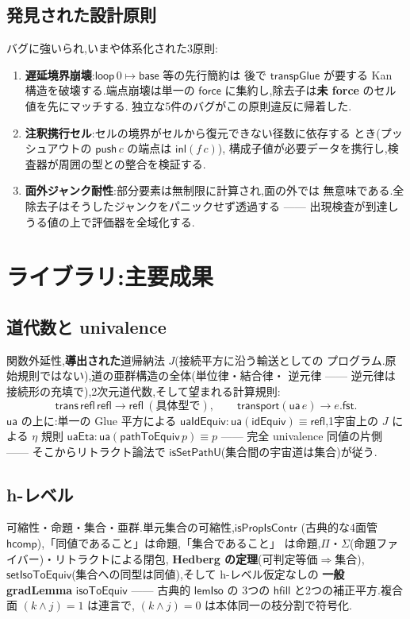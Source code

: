 \documentclass[11pt]{ltjsarticle}
\newcommand{\op}[1]{\ensuremath{\mathsf{#1}}}
\begin{document}
\subsection{発見された設計原則}
バグに強いられ,いまや体系化された3原則:
\begin{enumerate}[leftmargin=1.7em]
\item \textbf{遅延境界崩壊}:$\op{loop}\,0\mapsto\op{base}$ 等の先行簡約は
後で $\op{transpGlue}$ が要する Kan 構造を破壊する.端点崩壊は単一の
\op{force} に集約し,除去子は\textbf{未 force} のセル値を先にマッチする.
独立な5件のバグがこの原則違反に帰着した.
\item \textbf{注釈携行セル}:セルの境界がセルから復元できない径数に依存する
とき(プッシュアウトの $\op{push}\,c$ の端点は $\op{inl}(f\,c)$),
構成子値が必要データを携行し,検査器が周囲の型との整合を検証する.
\item \textbf{面外ジャンク耐性}:部分要素は無制限に計算され,面の外では
無意味である.全除去子はそうしたジャンクをパニックせず透過する ——
出現検査が到達しうる値の上で評価器を全域化する.
\end{enumerate}

\section{ライブラリ:主要成果}

\subsection{道代数と univalence}
関数外延性,\textbf{導出された}道帰納法 $J$(接続平方に沿う輸送としての
プログラム.原始規則ではない),道の亜群構造の全体(単位律・結合律・
逆元律 —— 逆元律は接続形の充填で),2次元道代数,そして望まれる計算規則:
\[
\op{trans}\,\op{refl}\,\op{refl}\longrightarrow\op{refl}
\ (\text{具体型で}),\qquad
\op{transport}(\op{ua}\,e)\longrightarrow e.\op{fst}.
\]
$\op{ua}$ の上に:単一の Glue 平方による
$\op{uaIdEquiv}:\op{ua}(\op{idEquiv})\equiv\op{refl}$,1宇宙上の $J$ による
$\eta$ 規則 $\op{uaEta}:\op{ua}(\op{pathToEquiv}\,p)\equiv p$ ——
完全 univalence 同値の片側 —— そこからリトラクト論法で
$\op{isSetPathU}$(集合間の宇宙道は集合)が従う.

\subsection{h-レベル}
可縮性・命題・集合・亜群.単元集合の可縮性,$\op{isPropIsContr}$
(古典的な4面管 $\op{hcomp}$),「同値であること」は命題,「集合であること」
は命題,$\Pi$・$\Sigma$(命題ファイバー)・リトラクトによる閉包,
\textbf{Hedberg の定理}(可判定等価$\Rightarrow$集合),
$\op{setIsoToEquiv}$(集合への同型は同値),そして h-レベル仮定なしの
\textbf{一般 gradLemma} $\op{isoToEquiv}$ —— 古典的 $\op{lemIso}$ の
3つの $\op{hfill}$ と2つの補正平方.複合面 $(k\wedge j){=}1$ は連言で,
$(k\wedge j){=}0$ は本体同一の枝分割で符号化.
\end{document}
